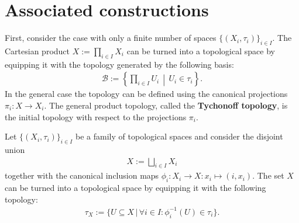 
\section{Associated constructions}

    \begin{construct}\label{topology:tychonoff_topology}
        First, consider the case with only a finite number of spaces $\{(X_i,\tau_i)\}_{i\in I}$. The Cartesian product $X:=\prod_{i\in I}X_i$ can be turned into a topological space by equipping it with the topology generated by the following basis:
        \begin{gather}
            \mathcal{B} := \left\{\prod_{i\in I}U_i\,\middle\vert\,U_i\in\tau_i\right\}.
        \end{gather}
        In the general case the topology can be defined using the canonical projections $\pi_i:X\rightarrow X_i$. The general product topology, called the \textbf{Tychonoff topology}, is the initial topology with respect to the projections $\pi_i$.
    \end{construct}

    \begin{construct}\label{topology:disjoint_union}
        Let $\{(X_i,\tau_i)\}_{i\in I}$ be a family of topological spaces and consider the disjoint union
        \begin{gather}
            X := \bigsqcup_{i\in I}X_i
        \end{gather}
        together with the canonical inclusion maps $\phi_i:X_i\rightarrow X:x_i\mapsto(i,x_i)$. The set $X$ can be turned into a topological space by equipping it with the following topology:
        \begin{gather}
            \tau_X := \big\{U\subseteq X\,\big\vert\,\forall i\in I:\phi_i^{-1}(U)\in\tau_i\big\}.
        \end{gather}
    \end{construct}


